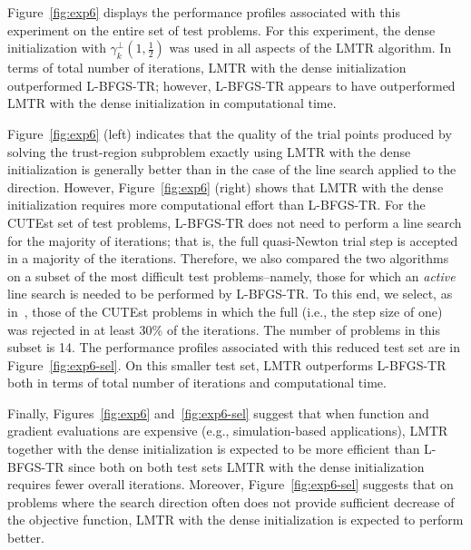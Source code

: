Figure~\ref{fig:exp6} displays the performance profiles associated with this experiment on
the entire set of test problems.  For this experiment, the dense initialization 
with $\gamma_k^{\perp}(1,\frac{1}{2})$ was used
in all aspects of the {\small LMTR} algorithm.
In terms of total number of iterations, {\small LMTR} with the dense initialization
outperformed {\small L-BFGS-TR}; however, {\small L-BFGS-TR} appears to have
outperformed {\small LMTR} with the dense initialization in computational time.


Figure~\ref{fig:exp6} (left) indicates that the quality of the trial
  points produced by solving the trust-region subproblem exactly using
  {\small LMTR} with the dense initialization is generally better than in
  the case of the line search applied to the \LBFGS{} direction.
 However, Figure~\ref{fig:exp6} (right) shows that {\small LMTR} with the dense
initialization requires more computational effort than {\small L-BFGS-TR}.
  For the
{\small CUTE}st set of test problems, {\small L-BFGS-TR} does not need to
perform a line search for the majority of iterations; 
that is, the full quasi-Newton trial step is accepted in a majority of the
iterations.  Therefore, we also compared the two algorithms on a subset of the
most difficult test problems--namely, those for which an \emph{active} line
search is needed to be performed by {\small L-BFGS-TR}.  To this end, we
select, as in~\cite{BurdakovLMTR16}, those of the {\small CUTE}st problems
in which the full \LBFGS{} (i.e., the step size of one)
was rejected in
at least 30\% of the iterations.  The number of problems in this subset
is 14.
The performance profiles associated with this reduced test set are in
Figure~\ref{fig:exp6-sel}.  On this smaller test set, {\small LMTR} outperforms
{\small L-BFGS-TR} both in terms of total number of iterations and computational time.

Finally, Figures~\ref{fig:exp6} and~\ref{fig:exp6-sel} suggest that when function
and gradient evaluations are expensive (e.g., simulation-based applications), {\small
LMTR} together with the dense initialization
is expected to be more efficient than {\small L-BFGS-TR}
since both on both test sets {\small LMTR} with
the dense initialization requires fewer overall iterations.  Moreover, Figure~\ref{fig:exp6-sel}
suggests that on problems where
the \LBFGS{} search direction 
often does not provide sufficient decrease of the objective function, {\small LMTR} with the 
dense initialization is expected to perform better.

